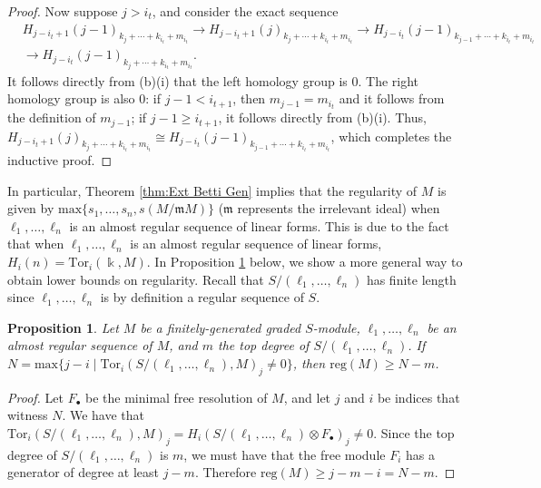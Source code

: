 \documentclass[a4paper, 10pt, reqno, english, ones]{amsart}  %
\newtheorem{proposition}[theorem]{Proposition}
\theoremstyle{definition}
\theoremstyle{remark}
\begin{document}
\begin{proof}
    Now suppose $j > i_t$, and consider the exact sequence
    \begin{align*}
    &H_{j-i_t+1}(j-1)_{k_j+\cdots + k_{i_t} + m_{i_t}} \longrightarrow H_{j-i_t+1}(j)_{k_j+\cdots + k_{i_t} + m_{i_t}} \longrightarrow H_{j-i_t}(j-1)_{k_{j-1}+\cdots + k_{i_t} + m_{i_t}}\\
    &\longrightarrow H_{j-i_t}(j-1)_{k_j+\cdots + k_{i_t} + m_{i_t}}.
    \end{align*}
    It follows directly from (b)(i) that the left homology group is $0$. The right homology group is also $0$: if $j-1<i_{t+1}$, then $m_{j-1}=m_{i_t}$ and it follows from the definition of $m_{j-1}$; if $j-1\geq i_{t+1}$, it follows directly from (b)(i). Thus, $H_{j-i_t+1}(j)_{k_j+\cdots+k_{i_t}+m_{i_t}} \cong H_{j-i_t}(j-1)_{k_{j-1}+\cdots + k_{i_t} + m_{i_t}}$, which completes the inductive proof.
\end{proof}

In particular, Theorem \ref{thm:Ext Betti Gen} implies that the regularity of $M$ is given by $\textrm{max}\{s_1,\dots,s_n,s(M/\mathfrak{m}M)\}$ ($\mathfrak{m}$ represents the irrelevant ideal) when $\ell_1,\dots,\ell_n$ is an almost regular sequence of linear forms. This is due to the fact that when $\ell_1,\dots,\ell_n$ is an almost regular sequence of linear forms, $H_i(n)=\textrm{Tor}_i(\Bbbk,M)$. In Proposition \ref{prop:Reg Lower} below, we show a more general way to obtain lower bounds on regularity. Recall that $S/(\ell_1,\dots,\ell_n)$ has finite length since $\ell_1,\dots,\ell_n$ is by definition a regular sequence of $S$.

\begin{proposition}\label{prop:Reg Lower}
    Let $M$ be a finitely-generated graded $S$-module, $\ell_1,\dots,\ell_n$ be an almost regular sequence of $M$, and $m$  the top degree of $S/(\ell_1,\dots,\ell_n)$. If $N=\textrm{max}\{j-i \mid \textrm{Tor}_i(S/(\ell_1,\dots,\ell_n),M)_j \neq 0 \}$, then $\textrm{reg}(M) \geq N-m$.
\end{proposition}
\begin{proof}
    Let $F_{\bullet}$ be the minimal free resolution of $M$, and let $j$ and $i$ be indices that witness $N$. We have that $\textrm{Tor}_i(S/(\ell_1,\dots,\ell_n), M)_j = H_i(S/(\ell_1,\dots,\ell_n)\otimes F_{\bullet})_j \neq 0$. Since the top degree of $S/(\ell_1,\dots,\ell_n)$ is $m$, we must have that the free module $F_i$ has a generator of degree at least $j-m$. Therefore $\textrm{reg}(M) \geq j-m-i=N-m$.
\end{proof}
\end{document}
